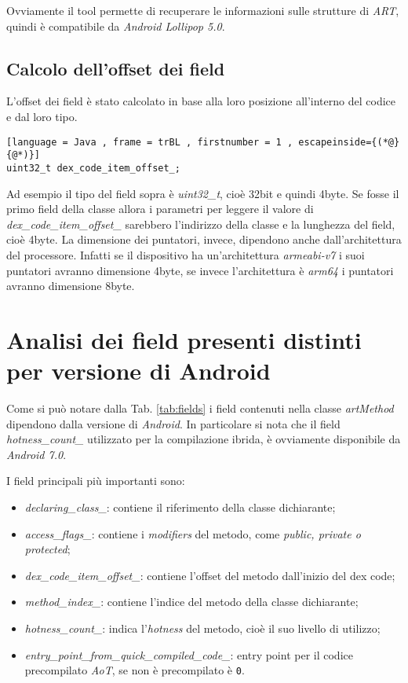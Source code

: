 Ovviamente il tool permette di recuperare le informazioni sulle strutture di \emph{ART}, quindi è compatibile da \emph{Android Lollipop 5.0}.

\subsection*{Calcolo dell'offset dei field}

L'offset dei field è stato calcolato in base alla loro posizione all'interno del codice e dal loro tipo.


\begin{lstlisting}[language = Java , frame = trBL , firstnumber = 1 , escapeinside={(*@}{@*)}]
uint32_t dex_code_item_offset_;

\end{lstlisting}

Ad esempio il tipo del field sopra è \emph{uint32\_t}, cioè 32bit e quindi 4byte. Se fosse il primo field della classe allora i parametri per leggere il valore di \emph{dex\_code\_item\_offset\_} sarebbero l'indirizzo della classe e la lunghezza del field, cioè 4byte.
La dimensione dei puntatori, invece, dipendono anche dall'architettura del processore. Infatti se il dispositivo ha un'architettura \emph{armeabi-v7} i suoi puntatori avranno dimensione 4byte, se invece l'architettura è \emph{arm64} i puntatori avranno dimensione 8byte.



\newpage

\section{Analisi dei field presenti distinti per versione di Android}



Come si può notare dalla Tab. \ref{tab:fields} i field contenuti nella classe \emph{artMethod} dipendono dalla versione di \emph{Android}. In particolare si nota che il field \emph{hotness\_count\_} utilizzato per la compilazione ibrida, è ovviamente disponibile da \emph{Android 7.0}.

I field principali più importanti sono:

\begin{itemize}
    \item \emph{declaring\_class\_}: contiene il riferimento della classe dichiarante;
    \item \emph{access\_flags\_}: contiene i \emph{modifiers} del metodo, come \emph{public, private o protected};
    \item \emph{dex\_code\_item\_offset\_}: contiene l'offset del metodo dall'inizio del dex code;
    \item \emph{method\_index\_}: contiene l'indice del metodo della classe dichiarante;
    \item \emph{hotness\_count\_}: indica l'\emph{hotness} del metodo, cioè il suo livello di utilizzo;
    \item \emph{entry\_point\_from\_quick\_compiled\_code\_}: entry point per il codice precompilato \emph{AoT}, se non è precompilato è \texttt{0}.
\end{itemize}


